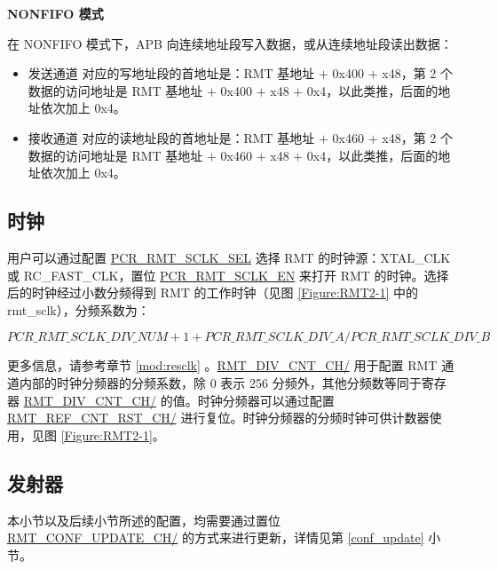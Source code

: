 \documentclass[main\_\_CN.tex]{subfiles}
\begin{document}
\textbf{NONFIFO 模式}

在 NONFIFO 模式下，APB 向连续地址段写入数据，或从连续地址段读出数据：
\begin{itemize}
    \item 发送通道  对应的写地址段的首地址是：RMT 基地址 $+$ 0x400 $+$ x48，第 2 个数据的访问地址是 RMT 基地址 $+$ 0x400 $+$ x48 $+$ 0x4，以此类推，后面的地址依次加上 0x4。
    \item 接收通道  对应的读地址段的首地址是：RMT 基地址 $+$ 0x460 $+$ x48，第 2 个数据的访问地址是 RMT 基地址 $+$ 0x460 $+$ x48 $+$ 0x4，以此类推，后面的地址依次加上 0x4。
\end{itemize}


\subsection{时钟}\label{clock}
用户可以通过配置 \hyperref[fielddesc:PCRRMTSCLKSEL]{PCR\_RMT\_SCLK\_SEL} 选择 RMT 的时钟源：XTAL\_CLK 或 RC\_FAST\_CLK，置位 \hyperref[fielddesc:PCRRMTSCLKEN]{PCR\_RMT\_SCLK\_EN} 来打开 RMT 的时钟。选择后的时钟经过小数分频得到 RMT 的工作时钟（见图 \ref{Figure:RMT2-1} 中的 rmt\_sclk），分频系数为：

$$
PCR\_RMT\_SCLK\_DIV\_NUM + 1 + PCR\_RMT\_SCLK\_DIV\_A/PCR\_RMT\_SCLK\_DIV\_B
$$

更多信息，请参考章节 \ref{mod:resclk} \textit{}。\hyperref[fielddesc:RMTDIVCNTCHN]{RMT\_DIV\_CNT\_CH/} 用于配置 RMT 通道内部的时钟分频器的分频系数，除 0 表示 256 分频外，其他分频数等同于寄存器 \hyperref[fielddesc:RMTDIVCNTCHN]{RMT\_DIV\_CNT\_CH/} 的值。时钟分频器可以通过配置 \hyperref[fielddesc:RMTREFCNTRSTCHN]{RMT\_REF\_CNT\_RST\_CH/} 进行复位。时钟分频器的分频时钟可供计数器使用，见图 \ref{Figure:RMT2-1}。

\subsection{发射器}
\vspace{0.4cm}

\begin{tiplisting}
本小节以及后续小节所述的配置，均需要通过置位 \hyperref[fielddesc:RMTCONFUPDATECHN]{RMT\_CONF\_UPDATE\_CH/} 的方式来进行更新，详情见第 \ref{conf_update} 小节。
\end{tiplisting}
\end{document}
